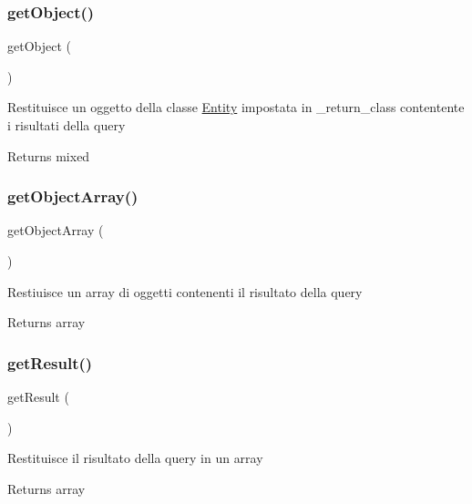 \subsubsection{\texorpdfstring{get\+Object()}{getObject()}}
{\footnotesize\ttfamily get\+Object (\begin{DoxyParamCaption}{ }\end{DoxyParamCaption})}

Restituisce un oggetto della classe \mbox{\hyperlink{namespace_entity}{Entity}} impostata in \+\_\+return\+\_\+class contentente i risultati della query

\begin{DoxyReturn}{Returns}
mixed 
\end{DoxyReturn}
\mbox{\label{class_fdb_a8c905ea0a0d60236497a91479c04c21a}} 
\subsubsection{\texorpdfstring{get\+Object\+Array()}{getObjectArray()}}
{\footnotesize\ttfamily get\+Object\+Array (\begin{DoxyParamCaption}{ }\end{DoxyParamCaption})}

Restiuisce un array di oggetti contenenti il risultato della query

\begin{DoxyReturn}{Returns}
array 
\end{DoxyReturn}
\mbox{\label{class_fdb_ae077eb8a032a325ceb939bfabfa5f472}} 
\subsubsection{\texorpdfstring{get\+Result()}{getResult()}}
{\footnotesize\ttfamily get\+Result (\begin{DoxyParamCaption}{ }\end{DoxyParamCaption})}

Restituisce il risultato della query in un array

\begin{DoxyReturn}{Returns}
array 
\end{DoxyReturn}
\mbox{\label{class_fdb_a3c1f4f1ffa871d0097a114a99771de35}} 
